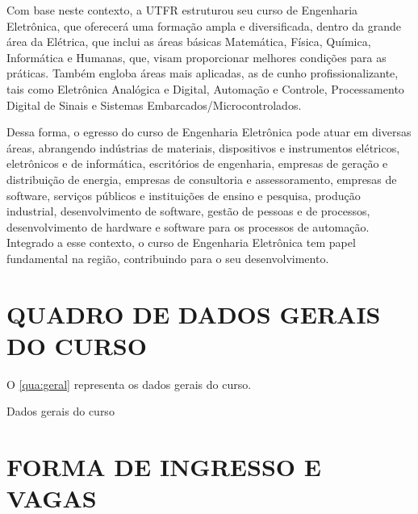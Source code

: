 Com base neste contexto, a UTFR estruturou seu curso de Engenharia Eletrônica, que oferecerá uma formação ampla e diversificada, dentro da grande área da Elétrica, que inclui as áreas básicas Matemática, Física, Química, Informática e Humanas, que, visam proporcionar melhores condições para as práticas. Também engloba áreas mais aplicadas, as de cunho profissionalizante, tais como Eletrônica Analógica e Digital, Automação e Controle, Processamento Digital de Sinais e Sistemas Embarcados/Microcontrolados.
 
Dessa forma, o egresso do curso de Engenharia Eletrônica pode atuar em diversas áreas, abrangendo indústrias de materiais, dispositivos e instrumentos elétricos, eletrônicos e de informática, escritórios de engenharia, empresas de geração e distribuição de energia, empresas de consultoria e assessoramento, empresas de software, serviços públicos e instituições de ensino e pesquisa, produção industrial, desenvolvimento de software, gestão de pessoas e de processos, desenvolvimento de hardware e software para os processos de automação. Integrado a esse contexto, o curso de Engenharia Eletrônica tem papel fundamental na região, contribuindo para o seu desenvolvimento.

\section{QUADRO DE DADOS GERAIS DO CURSO}

O \autoref{qua:geral} representa os dados gerais do curso.

\begin{quadro}
	\centering
	\caption[Dados gerais do curso]{Dados gerais do curso}
	\renewcommand{\arraystretch}{2}
	\label{qua:geral}
\end{quadro}

\section{FORMA DE INGRESSO E VAGAS}

